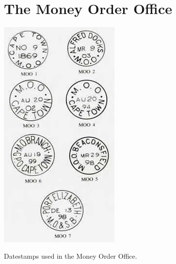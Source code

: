 \chapter{The Money Order Office
} 	 

\begin{marginfigure}
\includegraphics[width=.98\textwidth]{../cape-of-good-hope/moneyorderbranch/MOO-Stamps.jpg}
\caption{Datestamps used in the Money Order Office.}
\end{marginfigure}


